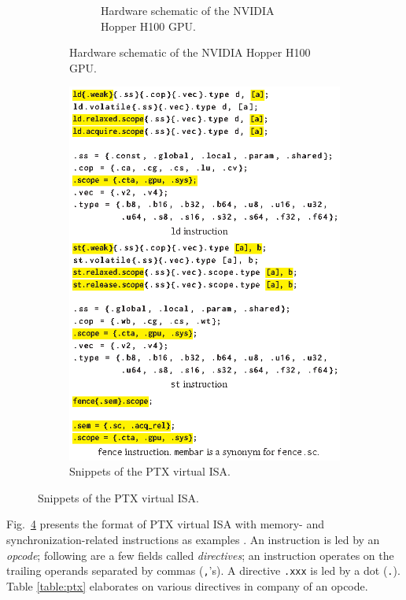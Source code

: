 \documentclass[acmsmall]{acmart}
\begin{document}
\begin{figure}[H]
\begin{subfigure}[b]{0.43\linewidth}
\begin{subfigure}[b]{\linewidth}
            \caption{Hardware schematic of the NVIDIA Hopper H100 GPU.}
            \label{fig:h100}
        \end{subfigure}
    \end{subfigure}
    \hspace{10pt} %
    \begin{subfigure}[b]{0.47\linewidth}
        \centering
        \includegraphics[width=\linewidth]{images/ptx.eps}
        \caption{Snippets of the PTX virtual ISA.}
        \label{fig:ptx}
    \end{subfigure}
\end{figure}

Fig.~\ref{fig:ptx} presents the format of PTX virtual ISA with memory- and synchronization-related instructions as examples \cite{ptx}. An instruction is led by an \textit{opcode}; following are a few fields called \textit{directives}; an instruction operates on the trailing operands separated by commas (\verb|,|'s). A directive \verb|.xxx| is led by a dot (\verb|.|). Table \ref{table:ptx} elaborates on various directives in company of an opcode.
\end{document}
